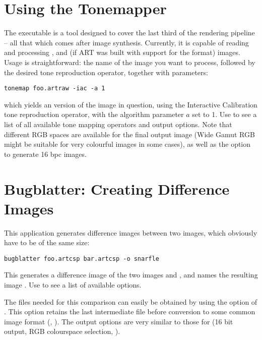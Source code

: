 \section{Using the Tonemapper}

The  executable is a tool designed to cover the last third of the rendering pipeline -- all that which comes after image synthesis. Currently, it is capable of reading and processing ,  and (if ART was built with support for the format)  images. Usage is straightforward: the name of the image you want to process, followed by the desired tone reproduction operator, together with parameters:

\begin{verbatim}
tonemap foo.artraw -iac -a 1 
\end{verbatim}

which yields an  version of the  image in
question, using the Interactive Calibration tone reproduction operator, with the algorithm parameter $a$ set to 1. Use  to see a list of all available tone mapping operators and output options. Note that different RGB spaces are available for the final output image (Wide Gamut RGB might be suitable for very colourful images in some cases), as well as the option to generate 16 bpc  images.

\section{Bugblatter: Creating Difference Images}
\label{sec:using:bugblatter}

This application generates difference images between two  images, which obviously have to be of the same size:

\begin{verbatim}
bugblatter foo.artcsp bar.artcsp -o snarfle
\end{verbatim}

This generates a difference image of the two images  and , and names the resulting image . Use  to see a list of available options.

The  files needed for this comparison can easily be obtained by using the  option of . This option retains the last intermediate  file before conversion to some common image format (, ). The output options are very similar to those for  (16 bit output, RGB colourspace selection, \etc).

